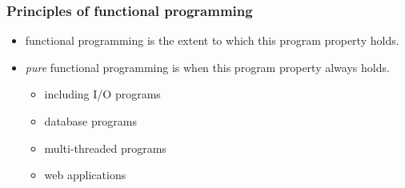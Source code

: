\begin{frame}
\frametitle{Principles of functional programming}
\begin{itemize}
\item<1-> functional programming is the extent to which this program property holds.
\item<2-> \emph{pure} functional programming is when this program property always holds.
          \begin{itemize}
          \item \tiny{including I/O programs}
          \item \tiny{database programs}
          \item \tiny{multi-threaded programs}
          \item \tiny{web applications}
          \end{itemize}  
\end{itemize}
\end{frame}
